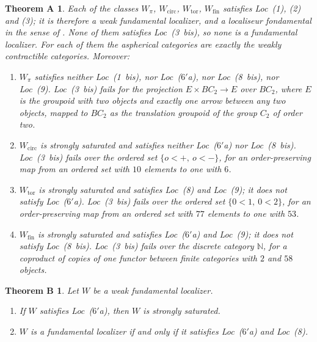 \documentclass[11pt,a4paper]{article}
\newtheorem*{theoremA}{Theorem A}
\newtheorem*{theoremB}{Theorem B}
\theoremstyle{definition}
\newcommand{\Wpi}{W_{\pi}}
\newcommand{\Wcirc}{W_{\mathrm{circ}}}
\newcommand{\Wtor}{W_{\mathrm{tor}}}
\newcommand{\Wfin}{W_{\mathrm{fin}}}
\newcommand{\N}{\mathbb{N}}
\begin{document}
\begin{theoremA}
Each of the classes $\Wpi$, $\Wcirc$, $\Wtor$, $\Wfin$ satisfies Loc~\textup{(1)},
\textup{(2)} and \textup{(3)}; it is therefore a weak fundamental localizer, and a localiseur
fondamental in the sense of \cite[XVI, D\'ef.~1.1]{Der}. None of them satisfies
Loc~\textup{(3~bis)}, so none is a fundamental localizer. For each of them the aspherical
categories are exactly the weakly contractible categories. Moreover:
\begin{enumerate}
\item[(a)] $\Wpi$ satisfies neither Loc~\textup{(1~bis)}, nor Loc~\textup{($6'$a)}, nor
Loc~\textup{(8~bis)}, nor Loc~\textup{(9)}. Loc~\textup{(3~bis)} fails for the projection $E\times BC_2\to E$ over
$BC_2$, where $E$ is the groupoid with two objects and exactly one arrow between any two
objects, mapped to $BC_2$ as the translation groupoid of the group $C_2$ of order two.
\item[(b)] $\Wcirc$ is strongly saturated and satisfies neither Loc~\textup{($6'$a)} nor
Loc~\textup{(8~bis)}.
Loc~\textup{(3~bis)} fails over the ordered set $\{o<+,\ o<-\}$, for an order-preserving map
from an ordered set with $10$ elements to one with $6$.
\item[(c)] $\Wtor$ is strongly saturated and satisfies Loc~\textup{(8)} and
Loc~\textup{(9)}; it does not satisfy Loc~\textup{($6'$a)}. Loc~\textup{(3~bis)} fails over the
ordered set $\{0<1,\ 0<2\}$, for an order-preserving map from an ordered set with $77$
elements to one with $53$.
\item[(d)] $\Wfin$ is strongly saturated and satisfies Loc~\textup{($6'$a)} and
Loc~\textup{(9)}; it does not satisfy Loc~\textup{(8~bis)}. Loc~\textup{(3~bis)} fails over the
discrete category $\N$, for a coproduct of copies of one functor between finite categories
with $2$ and $58$ objects.
\end{enumerate}
\end{theoremA}

\begin{theoremB}
Let $W$ be a weak fundamental localizer.
\begin{enumerate}
\item[(i)] If $W$ satisfies Loc~\textup{($6'$a)}, then $W$ is strongly saturated.
\item[(ii)] $W$ is a fundamental localizer if and only if it satisfies Loc~\textup{($6'$a)}
and Loc~\textup{(8)}.
\end{enumerate}
\end{theoremB}
\end{document}
